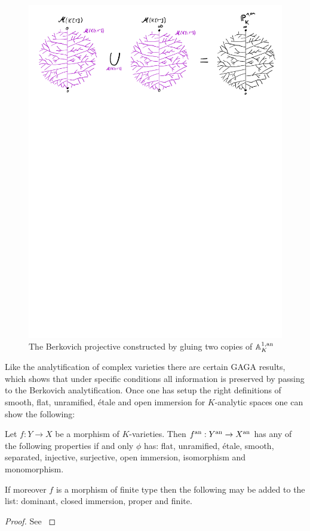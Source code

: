 \begin{figure}[h]
	\centering
	\includegraphics[width=\textwidth]{figures/projective_line}
	\caption{The Berkovich projective constructed by gluing two copies of $\mathbb{A}^{1, \text{an}}_K$}
	\label{fig:berk_projective_line}
\end{figure}


Like the analytification of complex varieties there are certain GAGA results, which shows that under specific conditions all information is preserved by passing to the Berkovich analytification. 
Once one has setup the right definitions of smooth, flat, unramified, étale and open immersion for $K$-analytic spaces one can show the following:
\begin{theorem}
	Let $f: Y \to X$  be a morphism of $K$-varieties. Then $f{}^{\text{an}}: Y {}^{\text{an}} \to X{}^{\text{an}}$ has any of the following properties if and only $\phi$ has: flat, unramified, étale, smooth, separated, injective, surjective, open immersion, isomorphism and monomorphism. 

	If moreover $f$ is a morphism of finite type then the following may be added to the list: dominant, closed immersion, proper and finite. 
\end{theorem}
\begin{proof}
	See \cite[][prop.\ 3.4.6 and prop.\ 3.4.7]{berkovichSpectralTheoryAnalytic2012}
\end{proof}

